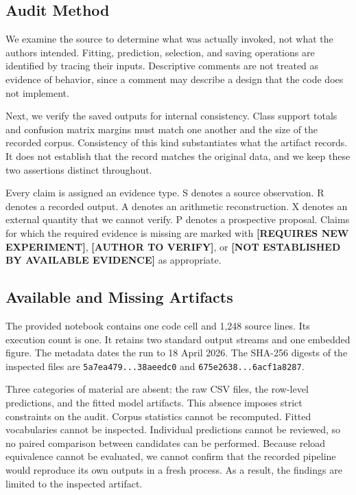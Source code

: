\documentclass[runningheads]{llncs}
\newcommand{\needexp}{\textbf{[REQUIRES NEW EXPERIMENT]}}
\newcommand{\verifyauthor}{\textbf{[AUTHOR TO VERIFY]}}
\newcommand{\notestablished}{\textbf{[NOT ESTABLISHED BY AVAILABLE EVIDENCE]}}
\begin{document}
\subsection{Audit Method}

We examine the source to determine what was actually invoked, not what the authors intended. Fitting, prediction, selection, and saving operations are identified by tracing their inputs. Descriptive comments are not treated as evidence of behavior, since a comment may describe a design that the code does not implement.

Next, we verify the saved outputs for internal consistency. Class support totals and confusion matrix margins must match one another and the size of the recorded corpus. Consistency of this kind substantiates what the artifact records. It does not establish that the record matches the original data, and we keep these two assertions distinct throughout.

Every claim is assigned an evidence type. S denotes a source observation. R denotes a recorded output. A denotes an arithmetic reconstruction. X denotes an external quantity that we cannot verify. P denotes a prospective proposal. Claims for which the required evidence is missing are marked with \needexp{}, \verifyauthor{}, or \notestablished{} as appropriate.

\subsection{Available and Missing Artifacts}

The provided notebook contains one code cell and 1,248 source lines. Its execution count is one. It retains two standard output streams and one embedded figure. The metadata dates the run to 18 April 2026. The SHA-256 digests of the inspected files are \texttt{5a7ea479...38aeedc0} and \texttt{675e2638...6acf1a8287}.

Three categories of material are absent: the raw CSV files, the row-level predictions, and the fitted model artifacts. This absence imposes strict constraints on the audit. Corpus statistics cannot be recomputed. Fitted vocabularies cannot be inspected. Individual predictions cannot be reviewed, so no paired comparison between candidates can be performed. Because reload equivalence cannot be evaluated, we cannot confirm that the recorded pipeline would reproduce its own outputs in a fresh process. As a result, the findings are limited to the inspected artifact.
\end{document}
